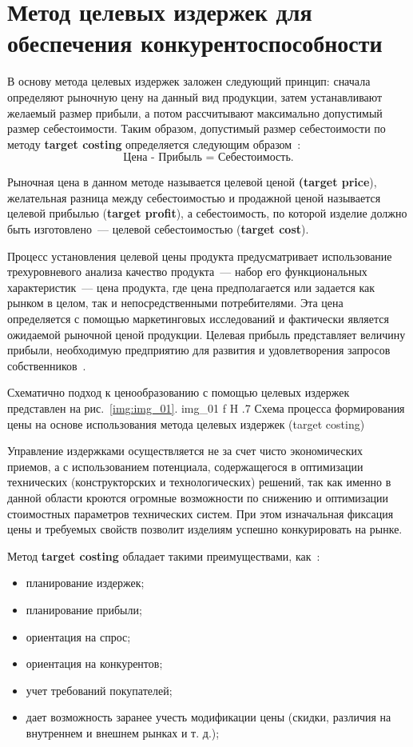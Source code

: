 \chapter{Метод целевых издержек для обеспечения конкурентоспособности}

В основу метода целевых издержек заложен следующий принцип: сначала определяют рыночную цену на данный вид продукции, затем устанавливают желаемый размер прибыли, а потом рассчитывают максимально допустимый размер себестоимости. 
Таким образом, допустимый размер себестоимости по методу \textbf{target costing} определяется следующим образом~\cite{target}: 
\begin{equation}
	\text{Цена - Прибыль = Себестоимость}.
\end{equation}

Рыночная цена в данном методе называется целевой ценой \textbf{(target price}), желательная разница между себестоимостью и продажной ценой называется целевой прибылью (\textbf{target profit}), а себестоимость, по которой изделие должно быть изготовлено~--- целевой себестоимостью (\textbf{target cost}).

Процесс установления целевой цены продукта предусматривает использование трехуровневого анализа качество продукта~--- набор его функциональных характеристик~--- цена продукта, где цена предполагается или задается как рынком в целом, так и непосредственными потребителями. Эта цена определяется с помощью маркетинговых исследований и фактически является ожидаемой рыночной ценой продукции. 
Целевая прибыль представляет величину прибыли, необходимую предприятию для развития и удовлетворения запросов собственников~\cite{target}.   

Схематично подход к ценообразованию с помощью целевых издержек представлен на рис.~\ref{img:img_01}. 
{img_01}
{f}
{H}
{.7\textwidth}
{Схема процесса формирования цены на основе использования  метода целевых издержек (target costing)~\cite{target}}

Управление издержками осуществляется не за счет чисто экономических приемов, а с использованием потенциала, содержащегося в оптимизации технических (конструкторских и технологических) решений, так как именно в данной области кроются огромные возможности по снижению и оптимизации стоимостных параметров технических систем. 
При этом изначальная фиксация цены и требуемых свойств позволит изделиям успешно конкурировать на рынке.

Метод \textbf{target costing} обладает такими преимуществами, как~\cite{target}:
\begin{itemize}
	\item планирование издержек;
	\item планирование прибыли;
	\item ориентация на спрос;
	\item ориентация на конкурентов;
	\item учет требований покупателей;
	\item дает возможность заранее учесть модификации цены (скидки, различия на внутреннем и внешнем рынках и т. д.); 
\end{itemize}

